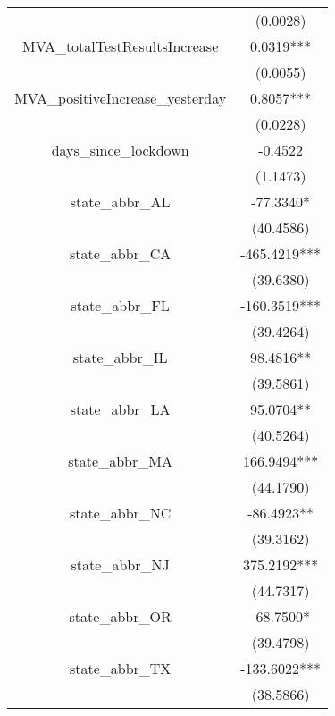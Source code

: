 \begin{center}
\begin{longtable*}{c c}
 & (0.0028)                                        \\
MVA\_totalTestResultsIncrease                   & 0.0319***    \\
 & (0.0055)                                        \\
MVA\_positiveIncrease\_yesterday & 0.8057***      \\
 & (0.0228)                                        \\
days\_since\_lockdown                           & -0.4522      \\
 & (1.1473)                                        \\
state\_abbr\_AL                                 & -77.3340*    \\
 & (40.4586)                                       \\
state\_abbr\_CA                                 & -465.4219*** \\
 & (39.6380)                                       \\
state\_abbr\_FL                                 & -160.3519*** \\
 & (39.4264)                                       \\
state\_abbr\_IL                                 & 98.4816**    \\
 & (39.5861)                                       \\
state\_abbr\_LA                                 & 95.0704**    \\
 & (40.5264)                                       \\
state\_abbr\_MA                                 & 166.9494***  \\
 & (44.1790)                                       \\
state\_abbr\_NC                                 & -86.4923**   \\
 & (39.3162)                                       \\
state\_abbr\_NJ                                 & 375.2192***  \\
 & (44.7317)                                       \\
state\_abbr\_OR                                 & -68.7500*    \\
 & (39.4798)                                       \\
state\_abbr\_TX                                 & -133.6022*** \\
 & (38.5866)                                       \\

\end{longtable*}
\end{center}
